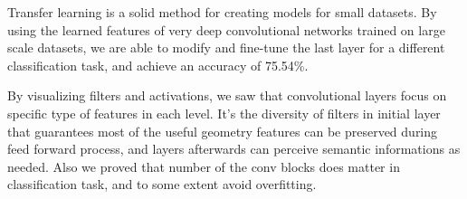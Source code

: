 
% 
% 

Transfer learning is a solid method for creating models for small datasets. By using the learned features of very deep convolutional networks trained on large scale datasets, we are able to modify and fine-tune the last layer for a different classification task, and achieve an accuracy of 75.54\%.

By visualizing filters and activations, we saw that convolutional layers focus on specific type of features in each level. It's the diversity of filters in initial layer that guarantees most of the useful geometry features can be preserved during feed forward process, and layers afterwards can perceive semantic informations as needed. Also we proved that number of the conv blocks does matter in classification task, and to some extent avoid overfitting. 













